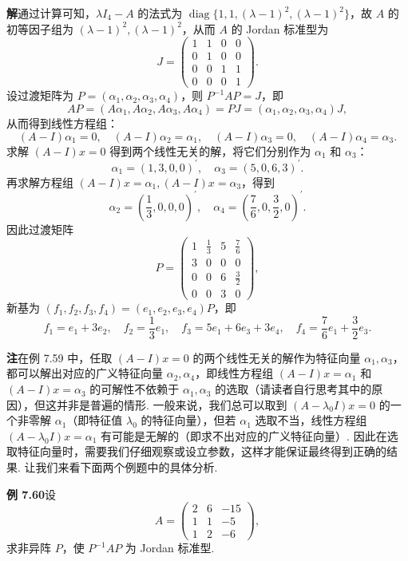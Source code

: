 \documentclass[UTF8,12pt,a4paper,fontset=fandol]{ctexart}
\begin{document}
\noindent\textbf{解}\quad 通过计算可知，$\lambda I_4-A$ 的法式为 $\operatorname{diag}\{1,1,(\lambda-1)^2,(\lambda-1)^2\}$，故 $A$ 的初等因子组为 $(\lambda-1)^2,(\lambda-1)^2$，从而 $A$ 的 Jordan 标准型为
\[
J=\left(\begin{array}{cccc}
1&1&0&0\\
0&1&0&0\\
0&0&1&1\\
0&0&0&1
\end{array}\right).
\]
设过渡矩阵为 $P=(\alpha_1,\alpha_2,\alpha_3,\alpha_4)$，则 $P^{-1}AP=J$，即
\[
AP=(A\alpha_1,A\alpha_2,A\alpha_3,A\alpha_4)=PJ=(\alpha_1,\alpha_2,\alpha_3,\alpha_4)J,
\]
从而得到线性方程组：
\[
(A-I)\alpha_1=0,\quad (A-I)\alpha_2=\alpha_1,\quad (A-I)\alpha_3=0,\quad (A-I)\alpha_4=\alpha_3.
\]
求解 $(A-I)x=0$ 得到两个线性无关的解，将它们分别作为 $\alpha_1$ 和 $\alpha_3$：
\[
\alpha_1=(1,3,0,0)^{\prime},\quad \alpha_3=(5,0,6,3)^{\prime}.
\]
再求解方程组 $(A-I)x=\alpha_1,(A-I)x=\alpha_3$，得到
\[
\alpha_2=\left(\frac13,0,0,0\right)^{\prime},\quad \alpha_4=\left(\frac76,0,\frac32,0\right)^{\prime}.
\]
因此过渡矩阵
\[
P=\left(\begin{array}{cccc}
1&\frac13&5&\frac76\\
3&0&0&0\\
0&0&6&\frac32\\
0&0&3&0
\end{array}\right),
\]
新基为 $(f_1,f_2,f_3,f_4)=(e_1,e_2,e_3,e_4)P$，即
\[
f_1=e_1+3e_2,\quad f_2=\frac13e_1,\quad f_3=5e_1+6e_3+3e_4,\quad f_4=\frac76e_1+\frac32e_3.
\]

\noindent\textbf{注}\quad 在例 7.59 中，任取 $(A-I)x=0$ 的两个线性无关的解作为特征向量 $\alpha_1,\alpha_3$，都可以解出对应的广义特征向量 $\alpha_2,\alpha_4$，即线性方程组 $(A-I)x=\alpha_1$ 和 $(A-I)x=\alpha_3$ 的可解性不依赖于 $\alpha_1,\alpha_3$ 的选取（请读者自行思考其中的原因），但这并非是普遍的情形. 一般来说，我们总可以取到 $(A-\lambda_0I)x=0$ 的一个非零解 $\alpha_1$（即特征值 $\lambda_0$ 的特征向量），但若 $\alpha_1$ 选取不当，线性方程组 $(A-\lambda_0I)x=\alpha_1$ 有可能是无解的（即求不出对应的广义特征向量）. 因此在选取特征向量时，需要我们仔细观察或设立参数，这样才能保证最终得到正确的结果. 让我们来看下面两个例题中的具体分析.

\noindent\textbf{例 7.60}\quad 设
\[
A=\left(\begin{array}{rrr}
2&6&-15\\
1&1&-5\\
1&2&-6
\end{array}\right),
\]
求非异阵 $P$，使 $P^{-1}AP$ 为 Jordan 标准型.
\end{document}
